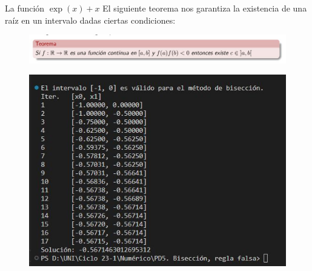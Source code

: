 \begin{frame}
	\begin{solution}
            La función 
            \begin{math}
			      \exp\left(x\right)+x
		      \end{math}
            El siguiente teorema nos garantiza la existencia de una raíz en un intervalo dadas ciertas condiciones:

            \begin{figure}			\includegraphics[width=0.5\paperwidth]{p14_teorema_existencia_sol.jpg}
		\end{figure}

		\begin{figure}			\includegraphics[width=0.5\paperwidth]{p14_bisection_execution.jpg}
		\end{figure}
	\end{solution}
\end{frame}

\begin{frame}[fragile]
	\begin{columns}
		\begin{column}{0.48\textwidth}
			\inputminted[fontsize=\tiny,firstline=1,lastline=24]{python}{p14_bisection.py}
		\end{column}
		\begin{column}{0.48\textwidth}
			\inputminted[fontsize=\tiny,firstline=26,lastline=52]{python}{p4_sor.py}
		\end{column}
	\end{columns}
\end{frame}

